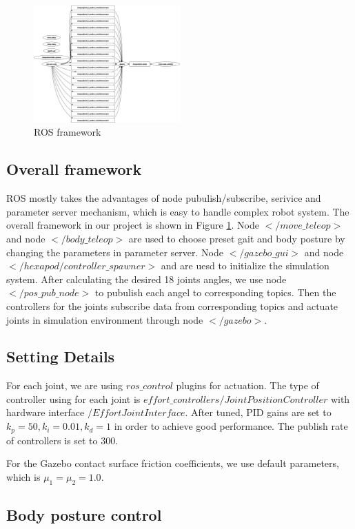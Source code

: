 \documentclass[conference]{IEEEtran}
\begin{document}
\begin{figure}
    \centerline{\includegraphics[width=0.5\textwidth]{rosgraph.png}}
    \caption{ROS framework}
    \label{fig11}
\end{figure}

\subsection{Overall framework}
ROS mostly takes the advantages of node pubulish/subscribe, serivice and parameter server mechanism, which is easy to handle complex robot system. The overall framework in our project is shown in Figure \ref{fig11}. Node \(</move\_teleop>\) and node \(</body\_teleop>\) are used to choose preset gait and body posture by changing the parameters in parameter server. Node \(</gazebo\_gui>\) and node \(</hexapod/controller\_spawner>\) and are uesd to initialize the simulation system. After calculating the desired 18 joints angles, we use node \(</pos\_pub\_node>\) to pubulish each angel to corresponding topics. Then the controllers for the joints subscribe data from corresponding topics and actuate joints in simulation environment through node \(</gazebo>\).
\subsection{Setting Details}

For each joint, we are using \(ros\_control\) plugins for actuation. The type of controller using for each joint is \(effort\_controllers/JointPositionController\) with hardware interface \(/EffortJointInterface\). After tuned, PID gains are set to \(k_p = 50, k_i = 0.01, k_d=1\) in order to achieve good performance. The publish rate of controllers is set to \(300\).  

For the Gazebo contact surface friction coefficients, we use default parameters, which is \(\mu_1 = \mu _2 = 1.0\).

\subsection{Body posture control}
\end{document}
